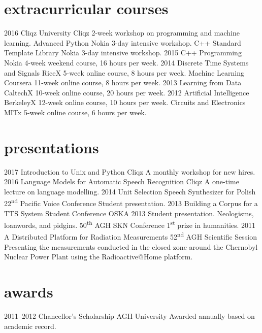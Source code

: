 \documentclass[]{friggeri-cv_osx}
\begin{document}
\section{extracurricular courses}
\begin{entrylist}
\entry
{2016}
{Cliqz University}
{Cliqz}
{2-week workshop on programming and machine learning.}
\entry
{}
{Advanced Python}
{Nokia}
{3-day intensive workshop.}
\entry
{}
{C++ Standard Template Library}
{Nokia}
{3-day intensive workshop.}
\entry
{2015}
{C++ Programming}
{Nokia}
{4-week weekend course, 16 hours per week.}
\entry
{2014}
{Discrete Time Systems and Signals}
{RiceX}
{5-week online course, 8 hours per week.}
\entry
{}
{Machine Learning}
{Coursera}
{11-week online course, 8 hours per week.}
\entry
{2013}
{Learning from Data}
{CaltechX}
{10-week online course, 20 hours per week.}
\entry
{2012}
{Artificial Intelligence}
{BerkeleyX}
{12-week online course, 10 hours per week.}
\entry
{}
{Circuits and Electronics}
{MITx}
{5-week online course, 6 hours per week.\\}
\end{entrylist}


\section{presentations}
\begin{entrylist}
\entry
{2017}
{Introduction to Unix and Python}
{Cliqz}
{A monthly workshop for new hires.}
\entry
{2016}
{Language Models for Automatic Speech Recognition}
{Cliqz}
{A one-time lecture on language modelling.}
\entry
{2014}
{Unit Selection Speech Synthesizer for Polish}
{22\textsuperscript{nd} Pacific Voice Conference}
{Student presentation.}
\entry
{2013}
{Building a Corpus for a TTS System}
{Student Conference OSKA 2013}
{Student presentation.}
\entry
{}
{Neologisms, loanwords, and pidgins.}
{50\textsuperscript{th} AGH SKN Conference}
{1\textsuperscript{st} prize in humanities.}
\entry
{2011}
{A Distributed Platform for Radiation Measurements}
{52\textsuperscript{nd} AGH Scientific Session}
{Presenting the measurements conducted in the closed zone around the Chernobyl Nuclear Power Plant using the Radioactive@Home platform.}
\end{entrylist}


\section{awards}
\begin{entrylist}
\entry
{2011--2012}
{Chancellor's Scholarship}
{AGH University}
{Awarded annually based on academic record.}
\end{entrylist}
\end{document}
